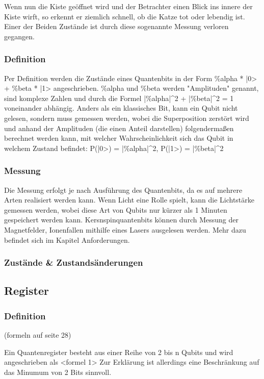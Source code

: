 Wenn nun die Kiste ge\"offnet wird und der Betrachter einen Blick ins innere der Kiste wirft, so erkennt er ziemlich schnell, ob die Katze tot oder lebendig ist. Einer der Beiden Zust\"ande ist durch diese sogenannte Messung verloren gegangen.

\subsubsection{Definition}

Per Definition werden die Zust\"ande eines Quantenbits in der Form \%alpha * |0> + \%beta * |1> angeschrieben.
\%alpha und \%beta werden "Amplituden" genannt, sind komplexe Zahlen und durch die Formel |\%alpha|^2 + |\%beta|^2 = 1 voneinander abh\"angig.
Anders als ein klassisches Bit, kann ein Qubit nicht gelesen, sondern muss gemessen werden, wobei die Superposition zerst\"ort wird und anhand der Amplituden (die einen Anteil darstellen) folgendermaßen berechnet werden kann, mit welcher Wahrscheinlichkeit sich das Qubit in welchem Zustand befindet: P(|0>) = |\%alpha|^2, P(|1>) = |\%beta|^2

\subsubsection{Messung}

Die Messung erfolgt je nach Ausf\"uhrung des Quantenbits, da es auf mehrere Arten realisiert werden kann. Wenn Licht eine Rolle spielt, kann die Lichtst\"arke gemessen werden, wobei diese Art von Qubits nur k\"urzer als 1 Minuten gespeichert werden kann. Kersnspinquantenbits k\"onnen durch Messung der Magnetfelder, Ionenfallen mithilfe eines Lasers ausgelesen werden. Mehr dazu befindet sich im Kapitel Anforderungen.

\subsubsection{Zust\"ande & Zustands\"anderungen}

\subsection{Register}
\label{sec:Register}

\subsubsection{Definition}
(formeln auf seite 28)

Ein Quantenregister besteht aus einer Reihe von 2 bis n Qubits und wird angeschrieben als <formel 1>
Zur Erkl\"arung ist allerdings eine Beschr\"ankung auf das Minumum von 2 Bits sinnvoll.

